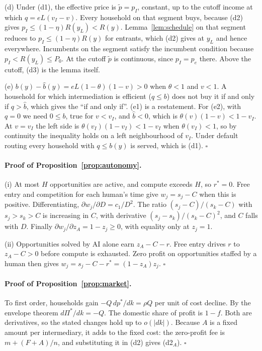 \documentclass[12pt]{article}
\theoremstyle{remark}
\begin{document}
(d) Under (d1), the effective price is $\tilde p=p_I$, constant, up to the cutoff income at which $q=eL(v_I-v)$. Every household on that segment buys, because (d2) gives $p_I\le(1-\eta)R(y_L)<R(y)$. Lemma~\ref{lem:schedule} on that segment reduces to $p_I\le(1-\eta)R(y)$ for entrants, which (d2) gives at $y_L$ and hence everywhere. Incumbents on the segment satisfy the incumbent condition because $p_I<R(y_L)\le P_0$. At the cutoff $\tilde p$ is continuous, since $p_I=p_e$ there. Above the cutoff, (d3) is the lemma itself.

(e) $b(y)-\hat b(y)=eL(1-\theta)(1-v)>0$ when $\theta<1$ and $v<1$. A household for which intermediation is efficient ($q\le b$) does not buy it if and only if $q>\hat b$, which gives the ``if and only if''. (e1) is a restatement. For (e2), with $q=0$ we need $0\le b$, true for $v<v_I$, and $\hat b<0$, which is $\theta(v)(1-v)<1-v_I$. At $v=v_I$ the left side is $\theta(v_I)(1-v_I)<1-v_I$ when $\theta(v_I)<1$, so by continuity the inequality holds on a left neighbourhood of $v_I$. Under default routing every household with $q\le b(y)$ is served, which is (d1). $\square$

\paragraph{Proof of Proposition~\ref{prop:autonomy}.}
(i) At most $H$ opportunities are active, and compute exceeds $H$, so $r^*=0$. Free entry and competition for each human's time give $w_j=s_j-C$ when this is positive. Differentiating, $\partial w_j/\partial D=c_1/D^2$. The ratio $(s_j-C)/(s_k-C)$ with $s_j>s_k>C$ is increasing in $C$, with derivative $(s_j-s_k)/(s_k-C)^2$, and $C$ falls with $D$. Finally $\partial w_j/\partial z_A=1-z_j\ge0$, with equality only at $z_j=1$.

(ii) Opportunities solved by AI alone earn $z_A-C-r$. Free entry drives $r$ to $z_A-C>0$ before compute is exhausted. Zero profit on opportunities staffed by a human then gives $w_j=s_j-C-r^*=(1-z_A)z_j$. $\square$

\paragraph{Proof of Proposition~\ref{prop:market}.} To first order, households gain $-Q\,dp^*/dk=\rho Q$ per unit of cost decline. By the envelope theorem $d\Pi^*/dk=-Q$. The domestic share of profit is $1-f$. Both are derivatives, so the stated changes hold up to $o(|dk|)$. Because $A$ is a fixed amount per intermediary, it adds to the fixed cost: the zero-profit fee is $m+(F+A)/n$, and substituting it in (d2) gives (d2$_A$). $\square$
\end{document}
